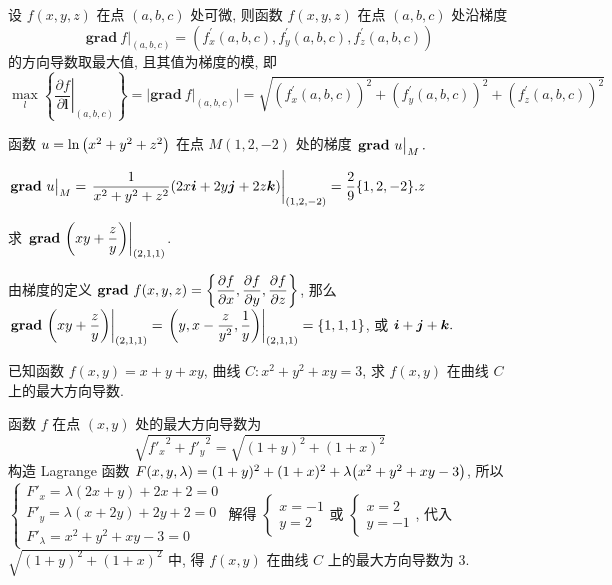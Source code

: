 \begin{theorem}[方向导数与梯度的关系]
    设 $ f(x, y, z) $ 在点 $ (a, b, c) $ 处可微, 则函数 $ f(x, y, z) $ 在点 $ (a, b, c) $ 处沿梯度
    $$\left.\mathbf{grad}~ f\right|_{(a, b, c)}=\left(f_{x}^{\prime}(a, b, c), f_{y}^{\prime}(a, b, c), f_{z}^{\prime}(a, b, c)\right)$$
    的方向导数取最大值, 且其值为梯度的模, 即
    $$\max _{l}\left\{\left.\frac{\partial f}{\partial \boldsymbol{l}}\right|_{(a, b, c)}\right\}=|\mathbf{grad}~ f|_{(a, b, c)} \mid =\sqrt{\left(f_{x}^{\prime}(a, b, c)\right)^{2}+\left(f_{y}^{\prime}(a, b, c)\right)^{2}+\left(f_{z}^{\prime}(a, b, c)\right)^{2}}$$
\end{theorem}

\begin{example}[1992 数一]
    函数 $u=\ln\qty(x^2+y^2+z^2)$ 在点 $M(1,2,-2)$ 处的梯度 $\eval{\mathbf{grad}~u}_{M}.$
\end{example}
\begin{solution}
    $\eval{\mathbf{grad}~u}_{M}=\eval{\dfrac{1}{x^2+y^2+z^2}(2x\vb*{i}+2y\vb*{j}+2z\vb*{k})}_{(1,2,-2)}=\dfrac{2}{9}\qty{1,2,-2}.z$
\end{solution}

\begin{example}[2012 数一]
    求 $\eval{\mathbf{grad}~\qty(xy+\dfrac{z}{y})}_{(2,1,1)}$.
\end{example}
\begin{solution}
    由梯度的定义 $\displaystyle\mathbf{grad}~f(x,y,z)=\qty{\pdv{f}{x},\pdv{f}{y},\pdv{f}{z}}$, 那么
    $\eval{\mathbf{grad}~\qty(xy+\dfrac{z}{y})}_{(2,1,1)}=\eval{\qty(y,x-\dfrac{z}{y^2},\dfrac{1}{y})}_{(2,1,1)}=\qty{1,1,1}$, 或 $\vb*{i}+\vb*{j}+\vb*{k}.$
\end{solution}

\begin{example}[2015 数一]
    已知函数 $f(x,y)=x+y+xy$, 曲线 $C:x^2+y^2+xy=3$, 求 $f(x,y)$ 在曲线 $C$ 上的最大方向导数.
\end{example}
\begin{solution}
    函数 $f$ 在点 $(x,y)$ 处的最大方向导数为 $$\sqrt{{f'_x}^2+{f'_y}^2}=\sqrt{(1+y)^2+(1+x)^2}$$
    构造 Lagrange 函数 $F(x,y,\lambda)=(1+y)^2+(1+x)^2+\lambda\qty(x^2+y^2+xy-3)$, 所以 
    $\begin{cases}
        F'_x=\lambda (2 x + y) + 2 x + 2=0\\ 
        F'_y=\lambda (x + 2 y) + 2 y + 2=0\\ 
        F'_\lambda=x^2+y^2+xy-3=0
    \end{cases}$ 解得 $\begin{cases}
        x=-1\\ y=2
    \end{cases}\text{或 }\begin{cases}
        x=2\\ y=-1
    \end{cases}$, 代入 $\sqrt{(1+y)^2+(1+x)^2}$ 中, 得 $f(x,y)$  在曲线 $C$ 上的最大方向导数为 $3$.
\end{solution}

